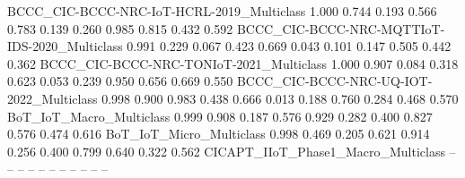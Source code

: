 BCCC_CIC-BCCC-NRC-IoT-HCRL-2019_Multiclass                                 1.000            0.744                                    0.193                           0.566           0.783                    0.139                                                     0.260                                     0.985                                     0.815                              0.432   0.592
BCCC_CIC-BCCC-NRC-MQTTIoT-IDS-2020_Multiclass                              0.991            0.229                                    0.067                           0.423           0.669                    0.043                                                     0.101                                     0.147                                     0.505                              0.442   0.362
BCCC_CIC-BCCC-NRC-TONIoT-2021_Multiclass                                   1.000            0.907                                    0.084                           0.318           0.623                    0.053                                                     0.239                                     0.950                                     0.656                              0.669   0.550
BCCC_CIC-BCCC-NRC-UQ-IOT-2022_Multiclass                                   0.998            0.900                                    0.983                           0.438           0.666                    0.013                                                     0.188                                     0.760                                     0.284                              0.468   0.570
BoT_IoT_Macro_Multiclass                                                   0.999            0.908                                    0.187                           0.576           0.929                    0.282                                                     0.400                                     0.827                                     0.576                              0.474   0.616
BoT_IoT_Micro_Multiclass                                                   0.998            0.469                                    0.205                           0.621           0.914                    0.256                                                     0.400                                     0.799                                     0.640                              0.322   0.562
CICAPT_IIoT_Phase1_Macro_Multiclass                                        --               --                                       --                              --              --                       --                                                        --                                        --                                        --                                 --     --                                        
